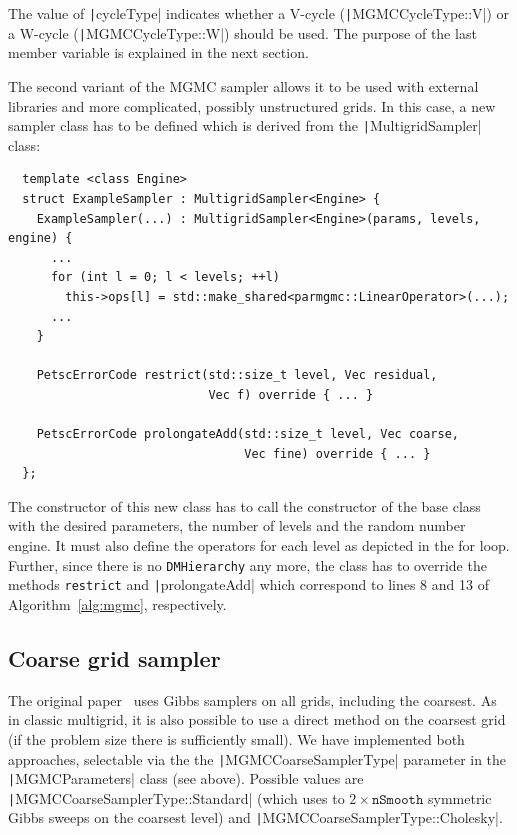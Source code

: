 \documentclass[
fontsize=11pt,
paper=a4,
numbers=noenddot
]{scrartcl}
\begin{document}
The value of \texttt|cycleType| indicates whether a V-cycle (\texttt|MGMCCycleType::V|) or a W-cycle (\texttt|MGMCCycleType::W|) should be used. The purpose of the last member variable is explained in the next section. 

The second variant of the MGMC sampler allows it to be used with external libraries and more complicated, possibly unstructured grids. In this case, a new sampler class has to be defined which is derived from the \texttt|MultigridSampler| class:
\begin{verbatim}
  template <class Engine> 
  struct ExampleSampler : MultigridSampler<Engine> {
    ExampleSampler(...) : MultigridSampler<Engine>(params, levels, engine) {
      ...
      for (int l = 0; l < levels; ++l)
        this->ops[l] = std::make_shared<parmgmc::LinearOperator>(...);
      ...
    }

    PetscErrorCode restrict(std::size_t level, Vec residual, 
                            Vec f) override { ... }

    PetscErrorCode prolongateAdd(std::size_t level, Vec coarse,
                                 Vec fine) override { ... }
  };    
\end{verbatim}
The constructor of this new class has to call the constructor of the base class with the desired parameters, the number of levels and the random number engine. It must also define the operators for each level as depicted in the for loop. Further, since there is no \texttt{DMHierarchy} any more, the class has to override the methods \texttt{restrict} and \texttt|prolongateAdd| which correspond to lines 8 and 13 of Algorithm~\ref{alg:mgmc}, respectively.

\subsection{Coarse grid sampler}
The original paper~\cite{goodmansokal} uses Gibbs samplers on all grids, including the coarsest. As in classic multigrid, it is also possible to use a direct method on the coarsest grid (if the problem size there is sufficiently small). We have implemented both approaches, selectable via the the \texttt|MGMCCoarseSamplerType| parameter in the \texttt|MGMCParameters| class (see above). Possible values are \texttt|MGMCCoarseSamplerType::Standard| (which uses to $2 \times \texttt{nSmooth}$ symmetric Gibbs sweeps on the coarsest level) and \texttt|MGMCCoarseSamplerType::Cholesky|.
\end{document}
